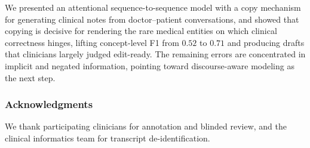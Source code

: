 \documentclass{article}
\begin{document}
We presented an attentional sequence-to-sequence model with a copy mechanism for
generating clinical notes from doctor--patient conversations, and showed that copying
is decisive for rendering the rare medical entities on which clinical correctness
hinges, lifting concept-level F1 from $0.52$ to $0.71$ and producing drafts that
clinicians largely judged edit-ready. The remaining errors are concentrated in
implicit and negated information, pointing toward discourse-aware modeling as the
next step.

\subsubsection*{Acknowledgments}

We thank participating clinicians for annotation and blinded review, and the clinical
informatics team for transcript de-identification.
\end{document}
